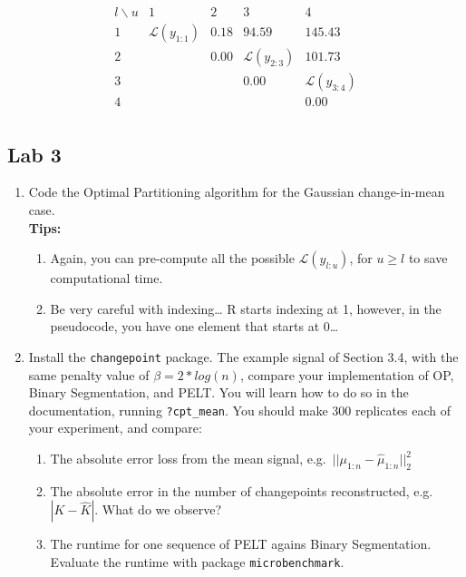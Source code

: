 \documentclass[
  letterpaper,
  DIV=11,
  numbers=noendperiod]{scrreprt}
\begin{document}
\[
\begin{array}{c|cccc}
l \backslash u & 1 & 2 & 3 & 4 \\
\hline
1 & \mathcal{L}(y_{1:1}) & 0.18 & 94.59 & 145.43 \\
2 &  & 0.00 & \mathcal{L}(y_{2:3}) & 101.73 \\
3 &  &  & 0.00 & \mathcal{L}(y_{3:4}) \\
4 &  &  &  & 0.00 \\
\end{array}
\]

\subsection{Lab 3}\label{lab-3}

\begin{enumerate}
\def\labelenumi{\arabic{enumi}.}
\item
  Code the Optimal Partitioning algorithm for the Gaussian
  change-in-mean case.\\
  \textbf{Tips:}

  \begin{enumerate}
  \def\labelenumii{\alph{enumii}.}
  \item
    Again, you can pre-compute all the possible
    \(\mathcal{L}(y_{l:u})\), for \(u \geq l\) to save computational
    time.
  \item
    Be very careful with indexing\ldots{} R starts indexing at 1,
    however, in the pseudocode, you have one element that starts at
    0\ldots{}
  \end{enumerate}
\item
  Install the \texttt{changepoint} package. The example signal of
  Section 3.4, with the same penalty value of \(\beta = 2 * log(n)\),
  compare your implementation of OP, Binary Segmentation, and PELT. You
  will learn how to do so in the documentation, running
  \texttt{?cpt\_mean}. You should make 300 replicates each of your
  experiment, and compare:

  \begin{enumerate}
  \def\labelenumii{\alph{enumii}.}
  \item
    The absolute error loss from the mean signal,
    e.g.~\(||\mu_{1:n} - \hat{\mu}_{1:n}||^2_2\)
  \item
    The absolute error in the number of changepoints reconstructed,
    e.g.~\(|K - \hat{K}|\). What do we observe?
  \item
    The runtime for one sequence of PELT agains Binary Segmentation.
    Evaluate the runtime with package \texttt{microbenchmark}.
  \end{enumerate}
\end{enumerate}
\end{document}
